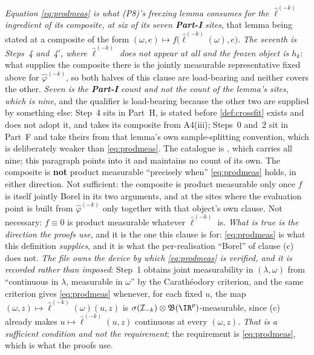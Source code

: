 \emph{Equation \eqref{eq:prodmeas} is what \textup{(P8)}'s freezing lemma consumes for the
$\hat\ell^{(-k)}$ \emph{ingredient} of its composite, at six of its seven \textbf{Part-I} sites}, that lemma being
stated at a composite of the form $(\omega,e)\mapsto f\big(\hat\ell^{(-k)}(\omega),e\big)$. \emph{The
seventh is  Steps~4 and~4$'$, where $\hat\ell^{(-k)}$ does not appear at all and the
frozen object is $h_k$}: what supplies the composite there is the jointly measurable representative fixed
above for $\hat\varphi^{(-k)}$, so both halves of this clause are load-bearing and neither covers the
other. \emph{Seven is the \textbf{Part-I} count and not the count of the lemma's sites, which is
nine}, and the qualifier is load-bearing because the other two are supplied by something else:
 Step~4 sits in Part~H, is stated before \cref{def:crossfit} exists and does
not adopt it, and takes its composite from A4(iii);  Steps~0 and~2 sit in
Part~F and take theirs from that lemma's own sample-splitting convention, which is deliberately
weaker than \eqref{eq:prodmeas}. The catalogue is , which carries all
nine; this paragraph points into it and maintains no count of its own. The composite is \textbf{not} product measurable ``precisely when'' \eqref{eq:prodmeas}
holds, in either direction. Not sufficient: the composite is product
measurable only once $f$ is itself jointly Borel in its two arguments, and at the sites where the
evaluation point is built from $\hat\varphi^{(-k)}$ only together with that object's own clause. Not
necessary: $f\equiv0$ is product measurable whatever $\hat\ell^{(-k)}$ is. \emph{What is true is the
direction the proofs use}, and it is the one this clause is for: \eqref{eq:prodmeas} is what this
definition \emph{supplies}, and it is what the per-realisation ``Borel'' of clause \textup{(c)} does not. \emph{The file owns the device by which \eqref{eq:prodmeas} is verified, and it
is recorded rather than imposed}:  Step~1 obtains joint measurability in
$(\lambda,\omega)$ from ``continuous in $\lambda$, measurable in $\omega$'' by the Carath\'eodory
criterion, and the same criterion gives \eqref{eq:prodmeas} whenever, for each fixed $u$, the map
$(\omega,z)\mapsto\hat\ell^{(-k)}(\omega)(u,z)$ is
$\sigma(\mathcal I_{-k})\otimes\mathfrak B(\IR^{p})$-measurable, since \textup{(c)} already makes
$u\mapsto\hat\ell^{(-k)}(u,z)$ continuous at every $(\omega,z)$. \emph{That is a sufficient condition and
not the requirement}; the requirement is \eqref{eq:prodmeas}, which is what the proofs use.

